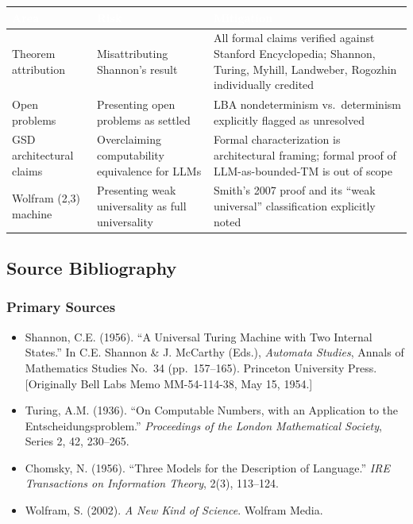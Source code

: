\documentclass[11pt,letterpaper]{article}
\newcommand{\tableheader}[1]{\textbf{\sffamily\textcolor{white}{#1}}}
\begin{document}
\begin{center}
\begin{tabularx}{\textwidth}{L{3cm}L{3cm}X}
\toprule
{}
\tableheader{Area} & \tableheader{Risk} & \tableheader{Mitigation} \\
\midrule
Theorem attribution & Misattributing Shannon's result & All formal claims verified against Stanford Encyclopedia; Shannon, Turing, Myhill, Landweber, Rogozhin individually credited \\
Open problems & Presenting open problems as settled & LBA nondeterminism vs.\ determinism explicitly flagged as unresolved \\
GSD architectural claims & Overclaiming computability equivalence for LLMs & Formal characterization is architectural framing; formal proof of LLM-as-bounded-TM is out of scope \\
Wolfram (2,3) machine & Presenting weak universality as full universality & Smith's 2007 proof and its ``weak universal'' classification explicitly noted \\
\bottomrule
\end{tabularx}
\end{center}

\subsection{Source Bibliography}

\subsubsection{Primary Sources}
\begin{itemize}
  \item Shannon, C.E. (1956). ``A Universal Turing Machine with Two Internal States.'' In C.E. Shannon \& J. McCarthy (Eds.), \textit{Automata Studies}, Annals of Mathematics Studies No.~34 (pp.~157--165). Princeton University Press. [Originally Bell Labs Memo MM-54-114-38, May 15, 1954.]
  \item Turing, A.M. (1936). ``On Computable Numbers, with an Application to the Entscheidungsproblem.'' \textit{Proceedings of the London Mathematical Society}, Series 2, 42, 230--265.
  \item Chomsky, N. (1956). ``Three Models for the Description of Language.'' \textit{IRE Transactions on Information Theory}, 2(3), 113--124.
  \item Wolfram, S. (2002). \textit{A New Kind of Science}. Wolfram Media.
\end{itemize}
\end{document}
